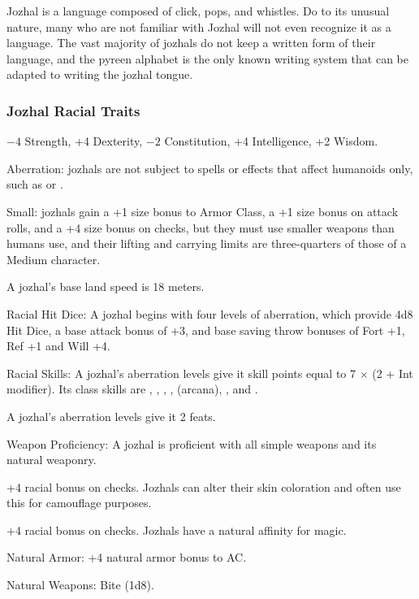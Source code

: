 Jozhal is a language composed of click, pops, and whistles. Do to its unusual nature, many who are not familiar with Jozhal will not even recognize it as a language. The vast majority of jozhals do not keep a written form of their language, and the pyreen alphabet is the only known writing system that can be adapted to writing the jozhal tongue.

\subsubsection{Jozhal Racial Traits}
\begin{itemize*}
    \item $-4$ Strength, +4 Dexterity, $-2$ Constitution, +4 Intelligence, +2 Wisdom.
    \item Aberration: jozhals are not subject to spells or effects that affect humanoids only, such as  or .
    \item Small: jozhals gain a +1 size bonus to Armor Class, a	+1 size bonus on attack rolls, and a +4 size bonus on  checks, but they must use smaller weapons than humans use, and their lifting and carrying limits are three-quarters of those of a Medium character.
    \item A jozhal's base land speed is 18 meters.
    \item Racial Hit Dice: A jozhal begins with four levels of aberration, which provide 4d8 Hit Dice, a base attack bonus of +3, and base saving throw bonuses of Fort +1, Ref +1 and Will +4.
    \item Racial Skills: A jozhal's aberration levels give it skill points equal to 7 $\times$ (2 + Int modifier). Its class skills are , , , ,  (arcana), , and .
    \item A jozhal's aberration levels give it 2 feats.
    \item Weapon Proficiency: A jozhal is proficient with all simple weapons and its natural weaponry.
    \item +4 racial bonus on  checks. Jozhals can alter their skin coloration and often use this for camouflage purposes.
    \item +4 racial bonus on  checks. Jozhals have a natural affinity for magic.
    \item Natural Armor: +4 natural armor bonus to AC.
    \item Natural Weapons: Bite (1d8).

\end{itemize*}
